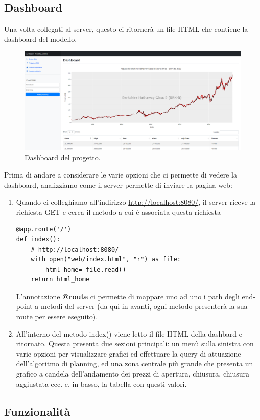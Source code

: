 \documentclass{article}
\begin{document}
\subsection{Dashboard}
Una volta collegati al server, questo ci ritornerà un file HTML che contiene la dashboard del modello.
\begin{figure}[H]
\centering
\includegraphics[width=1\linewidth]{dashboard.png}
\caption{\label{fig:train_dataset}Dashboard del progetto.}
\end{figure}
Prima di andare a considerare le varie opzioni che ci permette di vedere la dashboard, analizziamo come il server permette di inviare la pagina web:
\begin{enumerate}
    \item Quando ci colleghiamo all'indirizzo \href{http://localhost:8080/}{http://localhost:8080/}, il server riceve la richiesta GET e cerca il metodo a cui è associata questa richiesta
    \begin{verbatim}
@app.route('/')
def index():
    # http://localhost:8080/
    with open("web/index.html", "r") as file:
        html_home= file.read()
    return html_home
    \end{verbatim}
    L'annotazione \textbf{@route} ci permette di mappare uno ad uno i path degli end-point a metodi del server (da qui in avanti, ogni metodo presenterà la sua route per essere eseguito). 
\item All'interno del metodo index() viene letto il file HTML della dashbard e ritornato. Questa presenta due sezioni principali: un menù sulla sinistra con varie opzioni per visualizzare grafici ed effettuare la query di attuazione dell'algoritmo di planning, ed una zona centrale più grande che presenta un grafico a candela dell'andamento dei prezzi di apertura, chiusura, chiusura aggiustata ecc. e, in basso, la tabella con questi valori.
\end{enumerate}
\subsection{Funzionalità}
\end{document}
